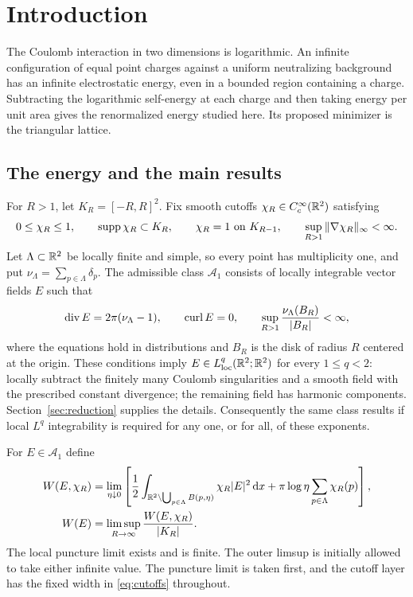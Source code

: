 \section{Introduction}\label{sec:introduction}

The Coulomb interaction in two dimensions is logarithmic. An infinite
configuration of equal point charges against a uniform neutralizing
background has an infinite electrostatic energy, even in a bounded region
containing a charge. Subtracting the logarithmic self-energy at each charge
and then taking energy per unit area gives the renormalized energy studied
here. Its proposed minimizer is the triangular lattice.

\subsection{The energy and the main results}

For $R>1$, let $K_R=[-R,R]^2$. Fix smooth cutoffs
$\chi_R\in C_c^\infty(\mathbb R^2)$ satisfying
\begin{equation}\label{eq:cutoffs}
0\leq\chi_R\leq1,\qquad
\operatorname{supp}\chi_R\subset K_R,\qquad
\chi_R=1\text{ on }K_{R-1},\qquad
\sup_{R>1}\|\nabla\chi_R\|_\infty<\infty.
\end{equation}
Let $\Lambda\subset\mathbb R^2$ be locally finite and simple, so every point has
multiplicity one, and put $\nu_\Lambda=\sum_{p\in\Lambda}\delta_p$.
The admissible class $\mathcal A_1$ consists of locally integrable vector
fields $E$ such that
\begin{equation}\label{eq:admissible}
\operatorname{div}E=2\pi(\nu_\Lambda-1),\qquad
\operatorname{curl} E=0,\qquad
\sup_{R>1}\frac{\nu_\Lambda(B_R)}{|B_R|}<\infty,
\end{equation}
where the equations hold in distributions and $B_R$ is the disk of radius
$R$ centered at the origin. These conditions imply
$E\in L^q_{\mathrm{loc}}(\mathbb R^2;\mathbb R^2)$ for every $1\leq q<2$:
locally subtract the finitely many Coulomb singularities and a smooth
field with the prescribed constant divergence; the remaining field has
harmonic components. Section~\ref{sec:reduction} supplies the details.
Consequently the same class results if local $L^q$ integrability is required
for any one, or for all, of these exponents.

For $E\in\mathcal A_1$ define
\begin{align}
W(E,\chi_R)
&=\lim_{\eta\downarrow0}\left[
 \frac12\int_{\mathbb R^2\setminus\bigcup_{p\in\Lambda}B(p,\eta)}
       \chi_R|E|^2\,\mathrm d x
 +\pi\log\eta\sum_{p\in\Lambda}\chi_R(p)\right],\label{eq:local-energy}\\
W(E)&=\limsup_{R\to\infty}\frac{W(E,\chi_R)}{|K_R|}.
\label{eq:whole-energy}
\end{align}
The local puncture limit exists and is finite. The outer limsup is
initially allowed to take either infinite value. The puncture limit is
taken first, and the cutoff layer has the fixed width in
\eqref{eq:cutoffs} throughout.


